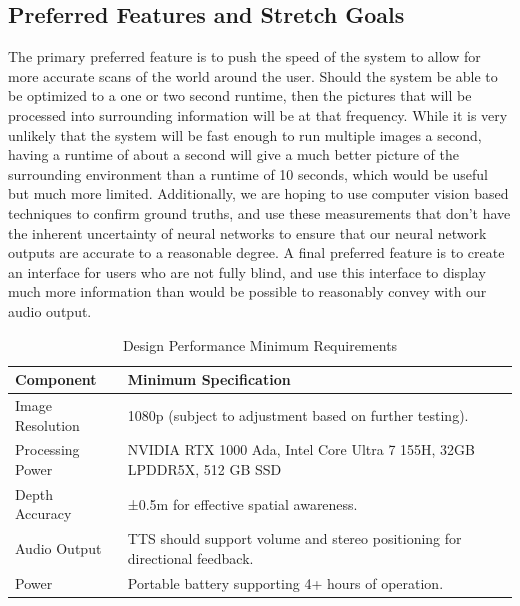 \documentclass[12pt,a4paper]{article}
\begin{document}
        \subsection{Preferred Features and Stretch Goals}
        The primary preferred feature is to push the speed of the system to allow for more accurate scans of the world around the user. Should the system be able to be optimized to a one or two second runtime, then the pictures that will be processed into surrounding information will be at that frequency. While it is very unlikely that the system will be fast enough to run multiple images a second, having a runtime of about a second will give a much better picture of the surrounding environment than a runtime of 10 seconds, which would be useful but much more limited. Additionally, we are hoping to use computer vision based techniques to confirm ground truths, and use these measurements that don’t have the inherent uncertainty of neural networks to ensure that our neural network outputs are accurate to a reasonable degree. A final preferred feature is to create an interface for users who are not fully blind, and use this interface to display much more information than would be possible to reasonably convey with our audio output.


        \begin{table}[h!]
            \centering
            \caption{Design Performance Minimum Requirements}
            \begin{tabular}{|l|p{10cm}|}
            \hline
            \label{tab:min}
            \textbf{Component} & \textbf{Minimum Specification} \\ \hline
            Image Resolution & 1080p (subject to adjustment based on further testing). \\ \hline
            Processing Power & NVIDIA RTX 1000 Ada, Intel Core Ultra 7 155H, 32GB LPDDR5X, 512 GB SSD \\ \hline
            Depth Accuracy & ±0.5m for effective spatial awareness. \\ \hline
            Audio Output & TTS should support volume and stereo positioning for directional feedback. \\ \hline
            Power & Portable battery supporting 4+ hours of operation. \\ \hline
            \end{tabular}
            
            \end{table}
\end{document}
